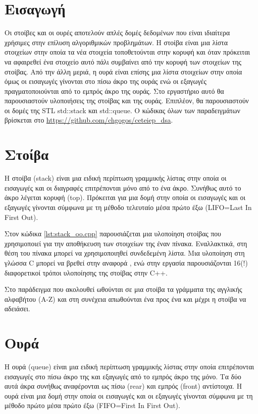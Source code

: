 \section{Εισαγωγή}
Οι στοίβες και οι ουρές αποτελούν απλές δομές δεδομένων που είναι ιδιαίτερα χρήσιμες στην επίλυση αλγοριθμικών προβλημάτων. Η στοίβα είναι μια λίστα στοιχείων στην οποία τα νέα στοιχεία τοποθετούνται στην κορυφή και όταν πρόκειται να αφαιρεθεί ένα στοιχείο αυτό πάλι συμβαίνει από την κορυφή των στοιχείων της στοίβας. Από την άλλη μεριά, η ουρά είναι επίσης μια λίστα στοιχείων στην οποία όμως οι εισαγωγές γίνονται στο πίσω άκρο της ουράς ενώ οι εξαγωγές πραγματοποιούνται από το εμπρός άκρο της ουράς. Στο εργαστήριο αυτό θα παρουσιαστούν υλοποιήσεις της στοίβας και της ουράς. Επιπλέον, θα παρουσιαστούν οι δομές της STL std::stack και std::queue.
Ο κώδικας όλων των παραδειγμάτων βρίσκεται στο \href{https://github.com/chgogos/ceteiep_dsa}{https://github.com/chgogos/ceteiep\_dsa}.

\section{Στοίβα}
Η στοίβα (stack) είναι μια ειδική περίπτωση γραμμικής λίστας στην οποία οι εισαγωγές και οι διαγραφές επιτρέπονται μόνο από το ένα άκρο. Συνήθως αυτό το άκρο λέγεται κορυφή (top). Πρόκειται για μια δομή στην οποία οι εισαγωγές και οι εξαγωγές γίνονται σύμφωνα με τη μέθοδο τελευταίο μέσα πρώτο έξω (LIFO=Last In First Out).

Στον κώδικα \ref{lst:stack_oo.cpp} παρουσιάζεται μια υλοποίηση στοίβας που χρησιμοποιεί για την αποθήκευση των στοιχείων της έναν πίνακα. Εναλλακτικά, στη θέση του πίνακα μπορεί να χρησιμοποιηθεί συνδεδεμένη λίστα. Μια υλοποίηση στη γλώσσα C μπορεί να βρεθεί στην αναφορά \cite{tcc_stack_linked_list}, ενώ στην εργασία \cite{stroustrup_stack} παρουσιάζονται 16(!) διαφορετικοί τρόποι υλοποίησης της στοίβας στην C++. 

Στο παράδειγμα που ακολουθεί ωθούνται σε μια στοίβα τα γράμματα της αγγλικής αλφαβήτου (Α-Ζ) και στη συνέχεια απωθούνται ένα προς ένα και μέχρι η στοίβα να αδειάσει.




\section{Ουρά}
Η ουρά (queue) είναι μια ειδική περίπτωση γραμμικής λίστας στην οποία επιτρέπονται εισαγωγές στο πίσω άκρο της και εξαγωγές από το εμπρός άκρο της μόνο. Τα δύο αυτά άκρα συνήθως αναφέρονται ως πίσω (rear) και εμπρός (front) αντίστοιχα. Η ουρά είναι μια δομή στην οποία οι εισαγωγές και οι εξαγωγές γίνονται σύμφωνα με τη μέθοδο πρώτο μέσα πρώτο έξω (FIFO=First In First Out).

